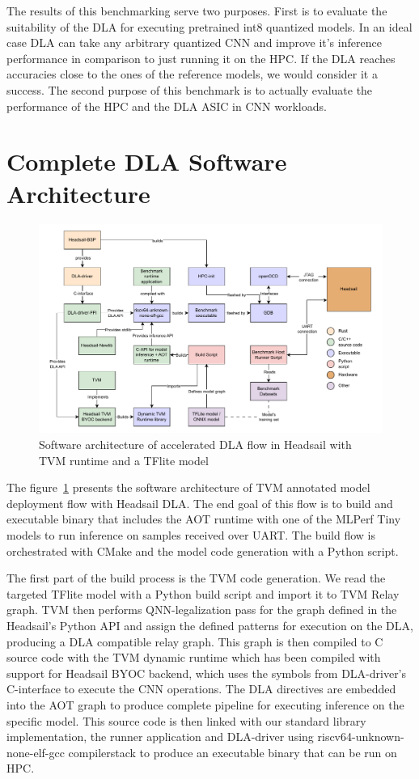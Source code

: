 \documentclass[12pt,a4paper,english
]{tunithesis}
\begin{document}
The results of this benchmarking serve two purposes. First is to evaluate the suitability of the DLA for executing pretrained int8 quantized models. In an ideal case DLA can take any arbitrary quantized CNN and improve it's inference performance in comparison to just running it on the HPC. If the DLA reaches accuracies close to the ones of the reference models, we would consider it a success.
The second purpose of this benchmark is to actually evaluate the performance of the HPC and the DLA ASIC in CNN workloads.

\section{Complete DLA Software Architecture}
\begin{figure}
\centering
\includegraphics[width=\linewidth]{img/dla-architecture-new.pdf}
\caption{Software architecture of accelerated DLA flow in Headsail with TVM runtime and a TFlite model}
\label{fig:architecture}
\end{figure}

The figure~\ref{fig:architecture} presents the software architecture of TVM annotated model deployment flow with Headsail DLA. The end goal of this flow is to build and executable binary that includes the AOT runtime with one of the MLPerf Tiny models to run inference on samples received over UART. The build flow is orchestrated with CMake and the model code generation with a Python script.

The first part of the build process is the TVM code generation. We read the targeted TFlite model with a Python build script and import it to TVM Relay graph.
TVM then performs QNN-legalization pass for the graph defined in the Headsail's Python API and assign the defined patterns for execution on the DLA, producing a DLA compatible relay graph.
This graph is then compiled to C source code with the TVM dynamic runtime which has been compiled with support for Headsail BYOC backend, which uses the symbols from DLA-driver's C-interface to execute the CNN operations. The DLA directives are embedded into the AOT graph to produce complete pipeline for executing inference on the specific model. This source code is then linked with our standard library implementation, the runner application and DLA-driver using riscv64-unknown-none-elf-gcc compilerstack to produce an executable binary that can be run on HPC.
\end{document}
